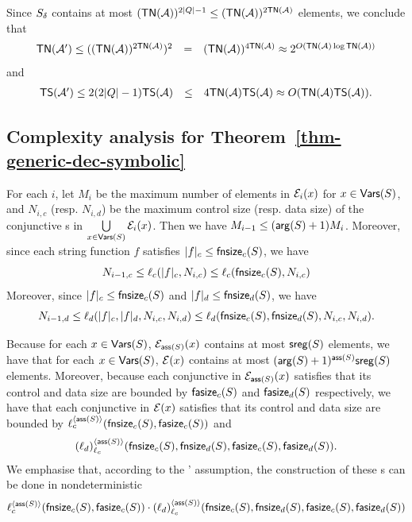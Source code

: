 Since $S_{\delta}$ contains at most $(\mathsf{TN}(\mathcal{A}))^{2|Q|-1} \le (\mathsf{TN}(\mathcal{A}))^{2\mathsf{TN}(\mathcal{A})}$ elements, we conclude that 
$$
\begin{array}{l c l}
\mathsf{TN}(\mathcal{A}') \le ((\mathsf{TN}(\mathcal{A}))^{2\mathsf{TN}(\mathcal{A})})^2  & = & (\mathsf{TN}(\mathcal{A}))^{4\mathsf{TN}(\mathcal{A})} 
 \approx    2^{O\left(\mathsf{TN}(\mathcal{A}) \log \mathsf{TN}(\mathcal{A})\right)}
\end{array}
$$ 
and 
$$
\begin{array}{l c l}
\mathsf{TS}(\mathcal{A}') \le 2(2|Q|-1)\mathsf{TS}(\mathcal{A})  & \le & 4 \mathsf{TN}(\mathcal{A}) \mathsf{TS}(\mathcal{A}) 
\approx   O( \mathsf{TN}(\mathcal{A}) \mathsf{TS}(\mathcal{A})).
\end{array}
$$



\subsection{Complexity analysis for Theorem~\ref{thm-generic-dec-symbolic}}

For each $i$, 
let $M_i$ be the maximum number of elements in $\mathcal{E}_i(x)$ for $x  \in \mathsf{Vars}(S)$,
and $N_{i,c}$ (resp. $N_{i, d}$) be the maximum control size (resp. data size) of the conjunctive \SA{}s in $\bigcup \limits_{x \in \mathsf{Vars}(S)} \mathcal{E}_i(x)$.
Then we have $M_{i-1} \le (\mathsf{arg}(S)+1)M_i $. Moreover, since each string function $f$ satisfies  $|f|_c \le \mathsf{fnsize}_c(S)$, we have 
%
$$N_{i-1, c} \le \ell_c(|f|_c, N_{i, c}) \le \ell_c(\mathsf{fnsize}_c(S), N_{i,c})$$ 
%
Moreover, since $|f|_c \le \mathsf{fnsize}_c(S)$ and $|f|_d \le \mathsf{fnsize}_d(S)$, we have
%
$$N_{i-1, d} \le \ell_d(|f|_c, |f|_d, N_{i, c}, N_{i,d}) \le \ell_d(\mathsf{fnsize}_c(S), \mathsf{fnsize}_d(S), N_{i, c}, N_{i,d}).$$ 

Because for each $x \in \mathsf{Vars}(S)$, $\mathcal{E}_{\mathsf{ass}(S)}(x)$ contains at most $\mathsf{sreg}(S)$ elements, we have that for each $x \in \mathsf{Vars}(S)$, $\mathcal{E}(x)$ contains at most $(\mathsf{arg}(S)+1)^{\mathsf{ass}(S)}\mathsf{sreg}(S)$ elements. 
Moreover, because each conjunctive \SA{} in $\mathcal{E}_{\mathsf{ass}(S)}(x)$ satisfies that its control and data size are bounded by $\mathsf{fasize}_c(S)$ and $\mathsf{fasize}_d(S)$ respectively, 
we have that each conjunctive \SA{} in $\mathcal{E}(x)$ satisfies that its control and data size are bounded by $\ell_c^{\langle \mathsf{ass}(S) \rangle}(\mathsf{fnsize}_c(S), \mathsf{fasize}_c(S))$ and 
%
\[ (\ell_d)^{\langle  \mathsf{ass}(S) \rangle}_{\ell_c}(\mathsf{fnsize}_c(S), \mathsf{fnsize}_d(S), \mathsf{fasize}_c(S), \mathsf{fasize}_d(S)).\]
% 
We emphasise that, according to the \prerec{}' assumption, the construction of these \SA{}s can be done in nondeterministic 
%
{
\small
$$\ell_c^{\langle  \mathsf{ass}(S) \rangle}(\mathsf{fnsize}_c(S), \mathsf{fasize}_c(S)) \cdot (\ell_d)^{\langle \mathsf{ass}(S) \rangle}_{\ell_c}(\mathsf{fnsize}_c(S),  \mathsf{fnsize}_d(S), \mathsf{fasize}_c(S), \mathsf{fasize}_d(S))$$
}

